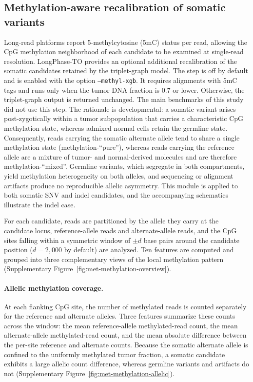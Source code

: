 \documentclass[pdflatex,sn-nature]{sn-jnl}
\begin{document}
\subsection{Methylation-aware recalibration of somatic variants}
\label{app:methylation-recalibration}

Long-read platforms report 5-methylcytosine (5mC) status per read, allowing the CpG methylation neighborhood of each candidate to be examined at single-read resolution. LongPhase-TO provides an optional additional recalibration of the somatic candidates retained by the triplet-graph model. The step is off by default and is enabled with the option \texttt{--methyl-xgb}. It requires alignments with 5mC tags and runs only when the tumor DNA fraction is 0.7 or lower. Otherwise, the triplet-graph output is returned unchanged. The main benchmarks of this study did not use this step. The rationale is developmental: a somatic variant arises post-zygotically within a tumor subpopulation that carries a characteristic CpG methylation state, whereas admixed normal cells retain the germline state. Consequently, reads carrying the somatic alternate allele tend to share a single methylation state (methylation-``pure''), whereas reads carrying the reference allele are a mixture of tumor- and normal-derived molecules and are therefore methylation-``mixed''. Germline variants, which segregate in both compartments, yield methylation heterogeneity on both alleles, and sequencing or alignment artifacts produce no reproducible allelic asymmetry. This module is applied to both somatic SNV and indel candidates, and the accompanying schematics illustrate the indel case.

For each candidate, reads are partitioned by the allele they carry at the candidate locus, reference-allele reads and alternate-allele reads, and the CpG sites falling within a symmetric window of \(\pm d\) base pairs around the candidate position (\(d=2{,}000\) by default) are analyzed. Ten features are computed and grouped into three complementary views of the local methylation pattern (Supplementary Figure~\ref{fig:met-methylation-overview}).

\paragraph{Allelic methylation coverage.} At each flanking CpG site, the number of methylated reads is counted separately for the reference and alternate alleles. Three features summarize these counts across the window: the mean reference-allele methylated-read count, the mean alternate-allele methylated-read count, and the mean absolute difference between the per-site reference and alternate counts. Because the somatic alternate allele is confined to the uniformly methylated tumor fraction, a somatic candidate exhibits a large allelic count difference, whereas germline variants and artifacts do not (Supplementary Figure~\ref{fig:met-methylation-allelic}).
\end{document}
